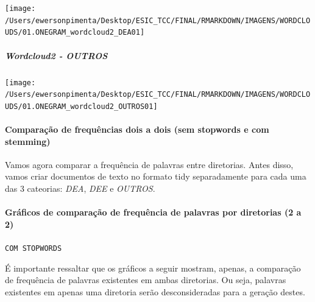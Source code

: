 \documentclass[]{article}
\newenvironment{Shaded}{\begin{snugshade}}{\end{snugshade}}
\newcommand{\KeywordTok}[1]{\textcolor[rgb]{0.13,0.29,0.53}{\textbf{#1}}}
\newcommand{\DataTypeTok}[1]{\textcolor[rgb]{0.13,0.29,0.53}{#1}}
\newcommand{\StringTok}[1]{\textcolor[rgb]{0.31,0.60,0.02}{#1}}
\newcommand{\CommentTok}[1]{\textcolor[rgb]{0.56,0.35,0.01}{\textit{#1}}}
\newcommand{\OperatorTok}[1]{\textcolor[rgb]{0.81,0.36,0.00}{\textbf{#1}}}
\newcommand{\NormalTok}[1]{#1}
\let\oldparagraph\paragraph
\renewcommand{\paragraph}[1]{\oldparagraph{#1}\mbox{}}
\let\oldsubparagraph\subparagraph
\renewcommand{\subparagraph}[1]{\oldsubparagraph{#1}\mbox{}}
\begin{document}
\texttt{[image: /Users/ewersonpimenta/Desktop/ESIC\_TCC/FINAL/RMARKDOWN/IMAGENS/WORDCLOUDS/01.ONEGRAM\_wordcloud2\_DEA01]}

\subparagraph{Wordcloud2 - OUTROS}\label{wordcloud2---outros}

\begin{Shaded}
\end{Shaded}

\texttt{[image: /Users/ewersonpimenta/Desktop/ESIC\_TCC/FINAL/RMARKDOWN/IMAGENS/WORDCLOUDS/01.ONEGRAM\_wordcloud2\_OUTROS01]}

\paragraph{Comparação de frequências dois a dois (sem stopwords e com
stemming)}\label{comparacao-de-frequencias-dois-a-dois-sem-stopwords-e-com-stemming}

Vamos agora comparar a frequência de palavras entre diretorias. Antes
disso, vamos criar documentos de texto no formato tidy separadamente
para cada uma das 3 cateorias: \emph{DEA}, \emph{DEE} e \emph{OUTROS}.

\paragraph{Gráficos de comparação de frequência de palavras por
diretorias (2 a
2)}\label{graficos-de-comparacao-de-frequencia-de-palavras-por-diretorias-2-a-2}

\texttt{COM\ STOPWORDS}

É importante ressaltar que os gráficos a seguir mostram, apenas, a
comparação de frequência de palavras existentes em ambas diretorias. Ou
seja, palavras existentes em apenas uma diretoria serão desconsideradas
para a geração destes.

\begin{Shaded}
\end{Shaded}
\end{document}
